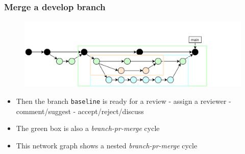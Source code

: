 \documentclass[aspectratio=169]{beamer} %
\begin{document}
\begin{frame}
	\frametitle{Merge a develop branch}
	
	\vspace{-.5cm}
	\begin{minipage}[t][5cm][t]{\textwidth}
		\begin{figure}
			\centering
			\includegraphics[width=\textwidth]{./img/dime-gitflow-network-2-6.png}
		\end{figure}
	\end{minipage}  
	
	\vspace{-.5cm}
	\begin{minipage}[t][5cm][t]{\textwidth}
		\begin{itemize}
			\setlength\itemsep{.5em}
			\item Then the branch \texttt{baseline} is ready for a review - assign a reviewer - comment/suggest - accept/reject/discuss
			\item The green box is also a \textit{branch-pr-merge} cycle
			\item This network graph shows a nested \textit{branch-pr-merge} cycle
		\end{itemize}
	\end{minipage}  
\end{frame}
\end{document}
